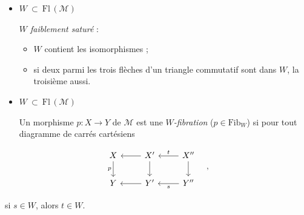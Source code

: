 \documentclass[11pt]{article}
\newcommand{\printedpage}[1]{\marginpar{\footnotesize p.~#1}}
\newcommand{\Fl}{\mathrm{Fl}\,}
\begin{document}
\begin{itemize}
\item $W \ \subset\ \Fl(\mathcal{M})$

\textit{$W$ faiblement saturé} :
\begin{itemize}
\item[a)] $W$ contient les isomorphismes ;
\item[b)] si deux parmi les trois flèches d'un triangle commutatif sont dans $W$, la troisième aussi.
\end{itemize}

\item $W \ \subset\ \Fl(\mathcal{M})$

Un morphisme $p : X \longrightarrow Y$ de $\mathcal{M}$ est une \textit{$W$-fibration} ($p \in \mathrm{Fib}_W$) si pour tout diagramme de carrés cartésiens
\end{itemize}

\printedpage{59}

\[
\begin{tikzcd}
X \arrow[d, "p"'] & X' \arrow[l] \arrow[d] & X'' \arrow[l, "t"'] \arrow[d] \\
Y & Y' \arrow[l] & Y'' \arrow[l, "s"]
\end{tikzcd}
\quad ,
\]

si $s \in W$, alors $t \in W$.
\end{document}
